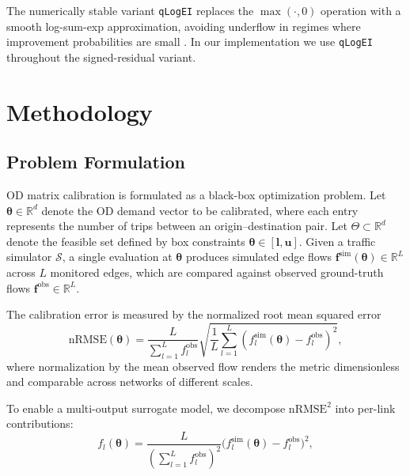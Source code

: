 \documentclass[11pt]{article}
\begin{document}
The numerically stable variant \texttt{qLogEI} replaces the $\max(\cdot, 0)$ operation
with a smooth log-sum-exp approximation, avoiding underflow in regimes where improvement
probabilities are small \parencite{Balandat2020}. In our implementation we use \texttt{qLogEI}
throughout the signed-residual variant.


\newpage

\section{Methodology}
\label{sec:method}

\subsection{Problem Formulation}
\label{sec:problem}



OD matrix calibration is formulated as a black-box optimization problem.
Let $\boldsymbol{\theta} \in \mathbb{R}^d$ denote the OD demand vector to be
calibrated, where each entry represents the number of trips between an
origin--destination pair. Let $\Theta \subset \mathbb{R}^d$ denote the
feasible set defined by box constraints $\boldsymbol{\theta} \in [\mathbf{l}, \mathbf{u}]$.
Given a traffic simulator $\mathcal{S}$, a single evaluation at
$\boldsymbol{\theta}$ produces simulated edge flows
$\mathbf{f}^{\mathrm{sim}}(\boldsymbol{\theta}) \in \mathbb{R}^L$ across
$L$ monitored edges, which are compared against observed ground-truth flows
$\mathbf{f}^{\mathrm{obs}} \in \mathbb{R}^L$.



The calibration error is measured by the normalized root mean squared error
\begin{equation}
\mathrm{nRMSE}(\boldsymbol{\theta})
=
\frac{L}{\sum_{l=1}^{L} f_l^{\mathrm{obs}}}
\sqrt{\frac{1}{L}\sum_{l=1}^{L}
\left(f_l^{\mathrm{sim}}(\boldsymbol{\theta}) - f_l^{\mathrm{obs}}\right)^2},
\label{eq:nrmse_def}
\end{equation}
where normalization by the mean observed flow renders the metric
dimensionless and comparable across networks of different scales.




To enable a multi-output surrogate model, we decompose $\mathrm{nRMSE}^2$
into per-link contributions:
\begin{equation}
    f_l(\boldsymbol{\theta})
    =
    \frac{L}{\left(\displaystyle\sum_{l=1}^{L} f_l^{\mathrm{obs}}\right)^2}
    \bigl(
        f_l^{\mathrm{sim}}(\boldsymbol{\theta})
        -
        f_l^{\mathrm{obs}}
    \bigr)^2,
    \label{eq:per_link_target}
\end{equation}
\end{document}
